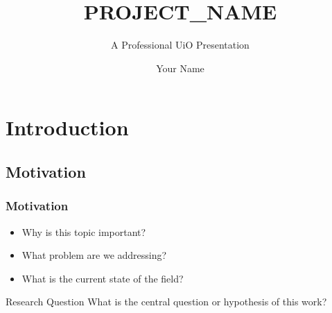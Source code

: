 

\title{PROJECT_NAME}
\subtitle{A Professional UiO Presentation}
\author{Your Name}



\uiofrontpage[
    dept={Your Department},
    info={Additional information (supervisor, grant, etc.)},
]


\section{Introduction}

\subsection{Motivation}
\begin{frame}
    \frametitle{Motivation}
    \begin{itemize}
        \item Why is this topic important?
        \item What problem are we addressing?
        \item What is the current state of the field?
    \end{itemize}
    
    \vspace{1em}
    \begin{block}{Research Question}
        What is the central question or hypothesis of this work?
    \end{block}
\end{frame}

